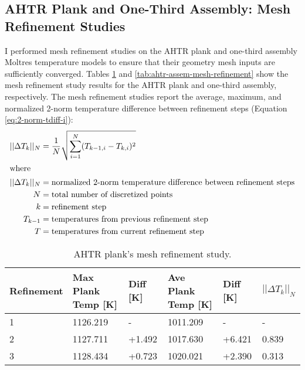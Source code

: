 \subsection{AHTR Plank and One-Third Assembly: Mesh Refinement Studies}
I performed mesh refinement studies on the \gls{AHTR} plank and one-third assembly 
Moltres temperature models to ensure that their geometry mesh inputs are sufficiently 
converged. 
Tables \ref{tab:ahtr-plank-mesh-refinement} and \ref{tab:ahtr-assem-mesh-refinement}
show the mesh refinement study results for the \gls{AHTR} plank and one-third 
assembly, respectively. 
The mesh refinement studies report the average, maximum, and normalized 2-norm 
temperature difference between refinement steps (Equation \ref{eq:2-norm-tdiff-i}):
\begin{align}
    \label{eq:2-norm-tdiff-i}
    ||\Delta T_k||_N &= \frac{1}{N}\sqrt{\sum_{i=1}^N(T_{k-1, i} - T_{k, i})^2} \\
\intertext{where}
    ||\Delta T_k||_N &= \mbox{normalized 2-norm temperature difference between refinement steps} \nonumber \\
    N &= \mbox{total number of discretized points} \nonumber \\
    k &= \mbox{refinement step} \nonumber \\
    T_{k-1} &= \mbox{temperatures from previous refinement step} \nonumber \\
    T &= \mbox{temperatures from current refinement step} \nonumber 
\end{align} 
\begin{table}[htbp]
    \centering
    \onehalfspacing
    \caption{\acrfull{AHTR} plank's mesh refinement study.}
	\label{tab:ahtr-plank-mesh-refinement}
    \scriptsize
    \begin{tabular}{lp{2.7cm}lp{2.7cm}ll}
        \hline 
        \textbf{Refinement} & \textbf{Max Plank Temp [K]} 
        & \textbf{Diff [K]} & \textbf{Ave Plank Temp [K]}
        & \textbf{Diff [K]} & $||\Delta T_k||_N$\\ 
        \hline 
        1 & 1126.219 & - & 1011.209 & - & - \\
        2 & 1127.711 & +1.492 & 1017.630 & +6.421 & 0.839\\
        3 & 1128.434 & +0.723 & 1020.021 & +2.390 & 0.313\\ 
        \hline
    \end{tabular}
\end{table}
